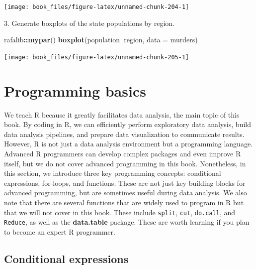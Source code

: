\documentclass[
]{krantz}
\newenvironment{Shaded}{\begin{snugshade}}{\end{snugshade}}
\newcommand{\DataTypeTok}[1]{\textcolor[rgb]{0.27,0.27,0.27}{#1}}
\newcommand{\KeywordTok}[1]{\textcolor[rgb]{0.27,0.27,0.27}{\textbf{#1}}}
\newcommand{\NormalTok}[1]{#1}
\newcommand{\OperatorTok}[1]{\textcolor[rgb]{0.43,0.43,0.43}{\textbf{#1}}}
\begin{document}
\begin{center}\texttt{[image: book\_files/figure-latex/unnamed-chunk-204-1]} \end{center}

3. Generate boxplots of the state populations by region.

\begin{Shaded}
\begin{Highlighting}[]
\NormalTok{rafalib}\OperatorTok{::}\KeywordTok{mypar}\NormalTok{()}
\KeywordTok{boxplot}\NormalTok{(population}\OperatorTok{~}\NormalTok{region, }\DataTypeTok{data =}\NormalTok{ murders)}
\end{Highlighting}
\end{Shaded}

\begin{center}\texttt{[image: book\_files/figure-latex/unnamed-chunk-205-1]} \end{center}

\hypertarget{programming-basics}{%
\chapter{Programming basics}\label{programming-basics}}

We teach R because it greatly facilitates data analysis, the main topic of this book. By coding in R, we can efficiently perform exploratory data analysis, build data analysis pipelines, and prepare data visualization to communicate results. However, R is not just a data analysis environment but a programming language. Advanced R programmers can develop complex packages and even improve R itself, but we do not cover advanced programming in this book. Nonetheless, in this section, we introduce three key programming concepts: conditional expressions, for-loops, and functions. These are not just key building blocks for advanced programming, but are sometimes useful during data analysis. We also note that there are several functions that are widely used to program in R but that we will not cover in this book. These include \texttt{split}, \texttt{cut}, \texttt{do.call}, and \texttt{Reduce}, as well as the \textbf{data.table} package. These are worth learning if you plan to become an expert R programmer.

\hypertarget{conditionals}{%
\section{Conditional expressions}\label{conditionals}}
\end{document}
